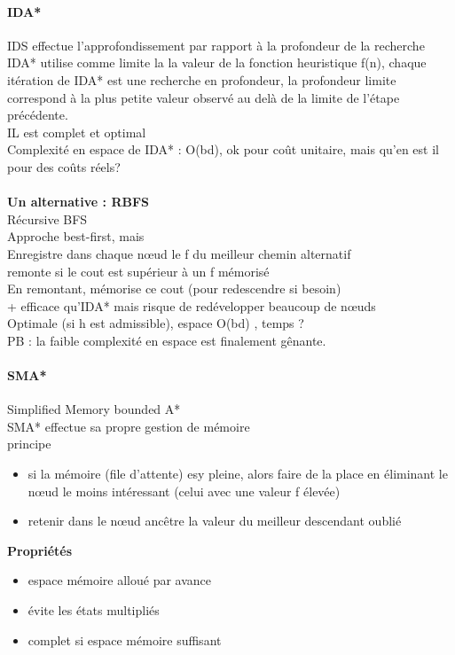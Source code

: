 \documentclass{article}
\begin{document}
\paragraph{IDA*} IDS effectue l'approfondissement par rapport à la profondeur de la recherche\\IDA* utilise comme limite la la valeur de la fonction heuristique f(n), chaque itération de IDA* est une recherche en profondeur, la profondeur limite correspond à la plus petite valeur observé au delà de la limite de l'étape précédente.\\IL est complet et optimal\\Complexité en espace de IDA* : O(bd), ok pour coût unitaire, mais qu'en est il pour des coûts réels? \\\\\textbf{Un alternative : RBFS}\\Récursive  BFS\\Approche best-first, mais\\Enregistre dans chaque nœud le f du meilleur chemin alternatif\\remonte si le cout est supérieur à un f mémorisé\\En remontant, mémorise ce cout (pour redescendre si besoin)\\+ efficace qu'IDA* mais risque de redévelopper beaucoup de nœuds\\Optimale (si h est admissible), espace O(bd) , temps ?\\PB : la faible complexité en espace est finalement gênante.
\paragraph{SMA*} Simplified Memory bounded A*\\SMA* effectue sa propre gestion de mémoire\\principe \begin{itemize}
\item si la mémoire (file d'attente) esy pleine, alors faire de la place en éliminant le nœud le moins intéressant (celui avec une valeur f élevée)
\item retenir dans le nœud ancêtre la valeur du meilleur descendant oublié

\end{itemize}
\textbf{Propriétés} 
\begin{itemize}
\item espace mémoire alloué par avance
\item évite les états multipliés
\item complet si espace mémoire suffisant
\end{itemize}
\end{document}
